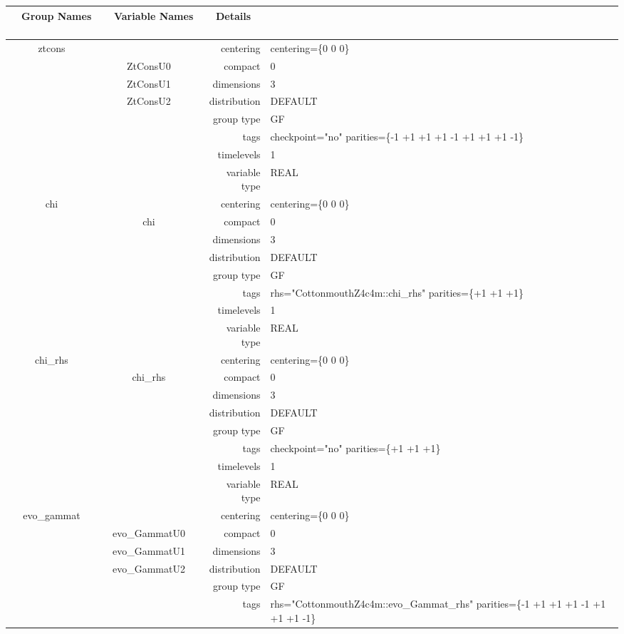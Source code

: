 \begin{tabular*}{150mm}{|c|c@{\extracolsep{\fill}}|rl|} \hline 
~ {\bf Group Names} ~ & ~ {\bf Variable Names} ~  &{\bf Details} ~ & ~ \\ 
\hline 
ztcons &  & centering & centering=\{0 0 0\} \\ 
 & ZtConsU0 & compact & 0 \\ 
 & ZtConsU1 & dimensions & 3 \\ 
 & ZtConsU2 & distribution & DEFAULT \\ 
 &  & group type & GF \\ 
 &  & tags & checkpoint="no" parities=\{-1 +1 +1  +1 -1 +1  +1 +1 -1\} \\ 
 &  & timelevels & 1 \\ 
 &  & variable type & REAL \\ 
\hline 
chi &  & centering & centering=\{0 0 0\} \\ 
 & chi & compact & 0 \\ 
 &  & dimensions & 3 \\ 
 &  & distribution & DEFAULT \\ 
 &  & group type & GF \\ 
 &  & tags & rhs="CottonmouthZ4c4m::chi\_rhs" parities=\{+1 +1 +1\} \\ 
 &  & timelevels & 1 \\ 
 &  & variable type & REAL \\ 
\hline 
chi\_rhs &  & centering & centering=\{0 0 0\} \\ 
 & chi\_rhs & compact & 0 \\ 
 &  & dimensions & 3 \\ 
 &  & distribution & DEFAULT \\ 
 &  & group type & GF \\ 
 &  & tags & checkpoint="no" parities=\{+1 +1 +1\} \\ 
 &  & timelevels & 1 \\ 
 &  & variable type & REAL \\ 
\hline 
evo\_gammat &  & centering & centering=\{0 0 0\} \\ 
 & evo\_GammatU0 & compact & 0 \\ 
 & evo\_GammatU1 & dimensions & 3 \\ 
 & evo\_GammatU2 & distribution & DEFAULT \\ 
 &  & group type & GF \\ 
 &  & tags & rhs="CottonmouthZ4c4m::evo\_Gammat\_rhs" parities=\{-1 +1 +1  +1 -1 +1  +1 +1 -1\} \\ 

\end{tabular*}

